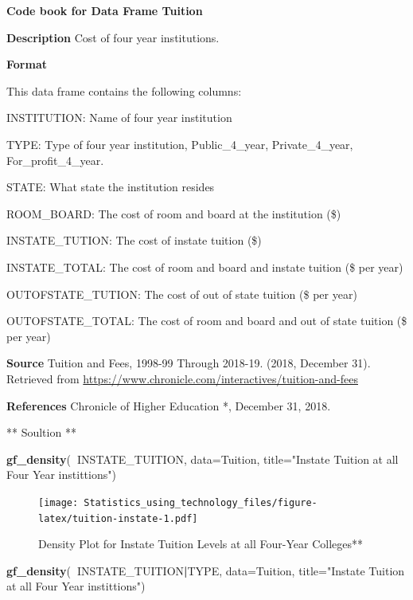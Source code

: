 \documentclass[]{book}
\newenvironment{Shaded}{\begin{snugshade}}{\end{snugshade}}
\newcommand{\DataTypeTok}[1]{\textcolor[rgb]{0.13,0.29,0.53}{#1}}
\newcommand{\KeywordTok}[1]{\textcolor[rgb]{0.13,0.29,0.53}{\textbf{#1}}}
\newcommand{\NormalTok}[1]{#1}
\newcommand{\OperatorTok}[1]{\textcolor[rgb]{0.81,0.36,0.00}{\textbf{#1}}}
\newcommand{\StringTok}[1]{\textcolor[rgb]{0.31,0.60,0.02}{#1}}
\begin{document}
\textbf{Code book for Data Frame Tuition}

\textbf{Description}
Cost of four year institutions.

\textbf{Format}

This data frame contains the following columns:

INSTITUTION: Name of four year institution

TYPE: Type of four year institution, Public\_4\_year, Private\_4\_year, For\_profit\_4\_year.

STATE: What state the institution resides

ROOM\_BOARD: The cost of room and board at the institution (\$)

INSTATE\_TUTION: The cost of instate tuition (\$)

INSTATE\_TOTAL: The cost of room and board and instate tuition (\$ per year)

OUTOFSTATE\_TUTION: The cost of out of state tuition (\$ per year)

OUTOFSTATE\_TOTAL: The cost of room and board and out of state tuition (\$ per year)

\textbf{Source}
Tuition and Fees, 1998-99 Through 2018-19. (2018, December 31). Retrieved from \url{https://www.chronicle.com/interactives/tuition-and-fees}

\textbf{References}
Chronicle of Higher Education *, December 31, 2018.

** Soultion **



\begin{Shaded}
\begin{Highlighting}[]
\KeywordTok{gf_density}\NormalTok{(}\OperatorTok{~}\NormalTok{INSTATE_TUITION, }\DataTypeTok{data=}\NormalTok{Tuition, }\DataTypeTok{title=}\StringTok{"Instate Tuition at all Four Year instittions"}\NormalTok{)}
\end{Highlighting}
\end{Shaded}

\begin{figure}
\centering
\texttt{[image: Statistics\_using\_technology\_files/figure-latex/tuition-instate-1.pdf]}
\caption{\label{fig:tuition-instate}Density Plot for Instate Tuition Levels at all Four-Year Colleges**}
\end{figure}



\begin{Shaded}
\begin{Highlighting}[]
\KeywordTok{gf_density}\NormalTok{(}\OperatorTok{~}\NormalTok{INSTATE_TUITION}\OperatorTok{|}\NormalTok{TYPE, }\DataTypeTok{data=}\NormalTok{Tuition, }\DataTypeTok{title=}\StringTok{"Instate Tuition at all Four Year instittions"}\NormalTok{)}
\end{Highlighting}
\end{Shaded}
\end{document}
